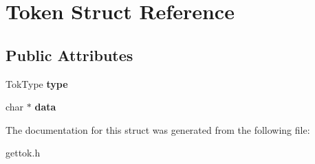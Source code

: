 \hypertarget{structToken}{\section{Token Struct Reference}
\label{structToken}
}
\subsection*{Public Attributes}
\begin{DoxyCompactItemize}
\item 
\hypertarget{structToken_a9b5952e2ac2e993a0b349aa975345ff4}{Tok\-Type {\bfseries type}}\label{structToken_a9b5952e2ac2e993a0b349aa975345ff4}

\item 
\hypertarget{structToken_aa45e570aa7bd8f984a98994f05e48405}{char $\ast$ {\bfseries data}}\label{structToken_aa45e570aa7bd8f984a98994f05e48405}

\end{DoxyCompactItemize}


The documentation for this struct was generated from the following file\-:\begin{DoxyCompactItemize}
\item 
gettok.\-h\end{DoxyCompactItemize}

